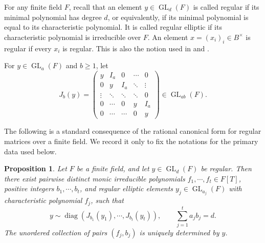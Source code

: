 \documentclass[11pt]{amsart}
\newtheorem{proposition}[theorem]{Proposition}
\theoremstyle{remark}
\def\GL{\operatorname{GL}}
\begin{document}
For any finite field $F$, 
recall that an element $y\in\GL_d(F)$ is called {regular} if its minimal
polynomial has degree $d$, or equivalently, if its minimal polynomial is equal to its
characteristic polynomial. It is called regular elliptic if its characteristic polynomial is irreducible over $F$. An element
$x=(x_i)_i\in B^{\times}$ is regular if every $x_i$ is regular. This is also the
notion used in \cite{WanNormTrace} and \cite{ZelingherMatrix}.

For $y\in\GL_a(F)$ and $b\ge 1$, let
\begin{equation}\label{eq:ss-J-block}
J_b(y)=
\begin{pmatrix}
y&I_a&0&\cdots&0\\
0&y&I_a&\ddots&\vdots\\
\vdots&\ddots&\ddots&\ddots&0\\
0&\cdots&0&y&I_a\\
0&\cdots&\cdots&0&y
\end{pmatrix}\in\GL_{ab}(F).
\end{equation}

The following is a standard consequence of the rational canonical form for regular matrices over a finite field. We record it only to fix the notations for the primary data used below.

\begin{proposition}\label{prop:ss-primary-decomposition}
Let $F$ be a finite field, and let $y\in\GL_d(F)$ be regular. Then there exist pairwise distinct monic irreducible polynomials
$f_1,\cdots,f_t\in F[T]$, positive integers $b_1,\cdots,b_t$, and regular
elliptic elements $y_j\in\GL_{a_j}(F)$ with characteristic polynomial
$f_j$, such that
\begin{equation}\label{eq:ss-primary-decomposition} y\sim\operatorname{diag}\left(J_{b_1}(y_1),\cdots,J_{b_t}(y_t)\right), \qquad \sum_{j=1}^{t}a_j b_j=d.
\end{equation}
The unordered collection of pairs $(f_j,b_j)$ is uniquely determined by $y$.
\end{proposition}
\end{document}
